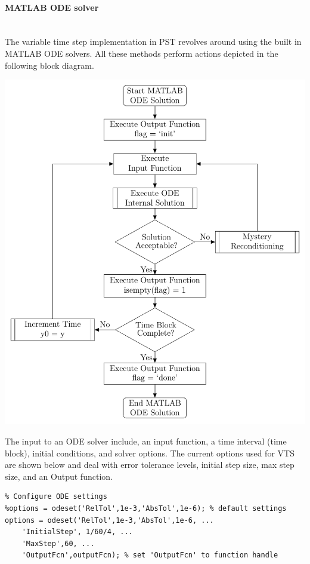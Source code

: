 \documentclass[12pt]{article}
\begin{document}
\pagebreak
\paragraph{MATLAB ODE solver} \ \\
The variable time step implementation in PST revolves around using the built in MATLAB ODE solvers.
All these methods perform actions depicted in the following block diagram.

\begin{center}
\includegraphics[width=.8\linewidth]{./../200804-ODEblockDiagram/200804-ODEblockDiagram}
\end{center}

The input to an ODE solver include, an input function, a time interval (time block), initial conditions, and solver options.
The current options used for VTS are shown below and deal with error tolerance levels, initial step size, max step size, and an Output function.

\begin{verbatim}
% Configure ODE settings
%options = odeset('RelTol',1e-3,'AbsTol',1e-6); % default settings
options = odeset('RelTol',1e-3,'AbsTol',1e-6, ...
    'InitialStep', 1/60/4, ...
    'MaxStep',60, ...
    'OutputFcn',outputFcn); % set 'OutputFcn' to function handle
\end{verbatim}
\end{document}
